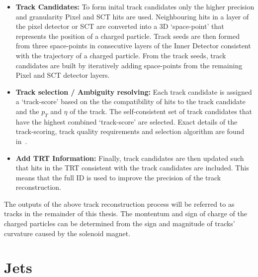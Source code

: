 \begin{itemize}[leftmargin=*]
\item\textbf{Track Candidates:}
  To form inital track candidates only the higher precision and granularity Pixel and SCT hits are used.
  Neighbouring hits in a layer of the pixel detector or SCT are converted into a 3D `space-point' that represents the position of a charged particle.
  Track seeds are then formed from three space-points in consecutive layers of the Inner Detector
  consistent with the trajectory of a charged particle. %
  From the track seeds, track candidates are built by iteratively adding space-points
  from the remaining Pixel and SCT detector layers.
  \vspace{0.5em}
\item\textbf{Track selection / Ambiguity resolving:}
  Each track candidate is assigned a `track-score' based on
  the the compatibility of hits to the track candidate and the $p_T$ and $\eta$ of the track.
  The self-consistent set of track candidates that have the highest combined `track-score' are selected.
  Exact details of the track-scoring, track quality requirements and selection algorithm are found in~\cite{obj-tracks_TIDE}.\vspace{0.5em}
\item\textbf{Add TRT Information:}
  Finally, track candidates are then updated such that hits in the TRT consistent with the track candidates are included.
  This means that the full ID is used to improve the precision of the track reconstruction.
\end{itemize}

The outputs of the above track reconstruction process will be referred to as tracks in the remainder of this thesis.
The montentum and sign of charge of the charged particles can be determined from the sign and magnitude of tracks' curvature
caused by the solenoid magnet.

\section{Jets}
\label{sec:obj-jets}

